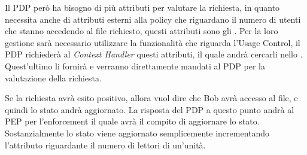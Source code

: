 Il PDP però ha bisogno di più attributi per valutare la richiesta, in quanto necessita anche di attributi esterni alla policy che riguardano il numero di utenti che stanno accedendo al file richiesto, questi attributi sono gli \statusattribute. Per la loro gestione sarà necessario utilizzare la funzionalità che riguarda l'Usage Control, il PDP richiederà al \textit{Context Handler} questi attributi, il quale andrà cercarli nello \status. Quest'ultimo li fornirà e verranno direttamente mandati al PDP per la valutazione della richiesta.\\ \par
Se la richiesta avrà esito positivo, allora vuol dire che Bob avrà accesso al file, e quindi lo stato andrà aggiornato. La risposta del PDP a questo punto andrà al PEP per l'enforcement il quale avrà il compito di aggiornare lo stato. Sostanzialmente lo stato viene aggiornato semplicemente incrementando l'attributo riguardante il numero di lettori di un'unità.




